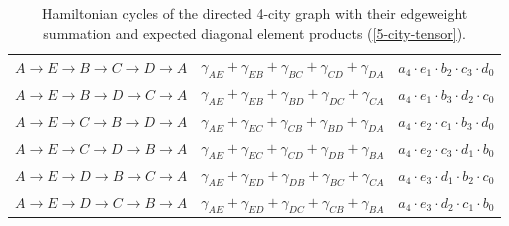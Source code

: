 \documentclass[msc,oneside]{ubcthesis}
\begin{document}
\begin{table}[h]
\begin{tabular}{|c|c|c|}
$A \rightarrow E \rightarrow B \rightarrow C \rightarrow D \rightarrow A$ & $ \gamma_{AE} + \gamma_{EB} + \gamma_{BC} + \gamma_{CD} + \gamma_{DA}$ & $a_4  \cdot e_1 \cdot b_2 \cdot c_3 \cdot d_0$ \\
$A \rightarrow E \rightarrow B \rightarrow D \rightarrow C \rightarrow A$ & $ \gamma_{AE} + \gamma_{EB} + \gamma_{BD} + \gamma_{DC} + \gamma_{CA}$ & $a_4  \cdot e_1 \cdot b_3 \cdot d_2 \cdot c_0$ \\
$A \rightarrow E \rightarrow C \rightarrow B \rightarrow D \rightarrow A$ & $ \gamma_{AE} + \gamma_{EC} + \gamma_{CB} + \gamma_{BD} + \gamma_{DA}$ & $a_4  \cdot e_2 \cdot c_1 \cdot b_3 \cdot d_0$ \\
$A \rightarrow E \rightarrow C \rightarrow D \rightarrow B \rightarrow A$ & $ \gamma_{AE} + \gamma_{EC} + \gamma_{CD} + \gamma_{DB} + \gamma_{BA}$ & $a_4  \cdot e_2 \cdot c_3 \cdot d_1 \cdot b_0$ \\
$A \rightarrow E \rightarrow D \rightarrow B \rightarrow C \rightarrow A$ & $ \gamma_{AE} + \gamma_{ED} + \gamma_{DB} + \gamma_{BC} + \gamma_{CA}$ & $a_4  \cdot e_3 \cdot d_1 \cdot b_2 \cdot c_0$ \\
$A \rightarrow E \rightarrow D \rightarrow C \rightarrow B \rightarrow A$ & $ \gamma_{AE} + \gamma_{ED} + \gamma_{DC} + \gamma_{CB} + \gamma_{BA}$ & $a_4  \cdot e_3 \cdot d_2 \cdot c_1 \cdot b_0$ \\
			\hline
			\end{tabular}
\caption{Hamiltonian cycles of the directed 4-city graph with their edgeweight summation and expected diagonal element products (\ref{5-city-tensor}).}
\label{table:ham-cycle-details-5-city}
\end{table}
\end{document}
